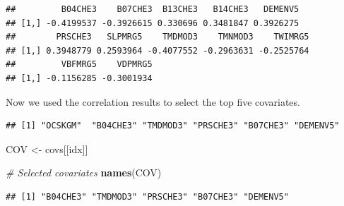 \documentclass[10pt,b5paper,]{book}
\newenvironment{Shaded}{\begin{snugshade}}{\end{snugshade}}
\newcommand{\CommentTok}[1]{\textcolor[rgb]{0.56,0.35,0.01}{\textit{#1}}}
\newcommand{\DecValTok}[1]{\textcolor[rgb]{0.00,0.00,0.81}{#1}}
\newcommand{\KeywordTok}[1]{\textcolor[rgb]{0.13,0.29,0.53}{\textbf{#1}}}
\newcommand{\NormalTok}[1]{#1}
\newcommand{\OperatorTok}[1]{\textcolor[rgb]{0.81,0.36,0.00}{\textbf{#1}}}
\newcommand{\OtherTok}[1]{\textcolor[rgb]{0.56,0.35,0.01}{#1}}
\newcommand{\StringTok}[1]{\textcolor[rgb]{0.31,0.60,0.02}{#1}}
\theoremstyle{definition}
\theoremstyle{definition}
\theoremstyle{definition}
\theoremstyle{remark}
\begin{document}
\begin{verbatim}
##         B04CHE3    B07CHE3  B13CHE3   B14CHE3   DEMENV5
## [1,] -0.4199537 -0.3926615 0.330696 0.3481847 0.3926275
##        PRSCHE3   SLPMRG5    TMDMOD3    TMNMOD3    TWIMRG5
## [1,] 0.3948779 0.2593964 -0.4077552 -0.2963631 -0.2525764
##         VBFMRG5    VDPMRG5
## [1,] -0.1156285 -0.3001934
\end{verbatim}

Now we used the correlation results to select the top five covariates.

\begin{Shaded}
\end{Shaded}

\begin{verbatim}
## [1] "OCSKGM"  "B04CHE3" "TMDMOD3" "PRSCHE3" "B07CHE3" "DEMENV5"
\end{verbatim}

\begin{Shaded}
\begin{Highlighting}[]
\NormalTok{COV <-}\StringTok{ }\NormalTok{covs[[idx]]}

\CommentTok{# Selected covariates}
\KeywordTok{names}\NormalTok{(COV)}
\end{Highlighting}
\end{Shaded}

\begin{verbatim}
## [1] "B04CHE3" "TMDMOD3" "PRSCHE3" "B07CHE3" "DEMENV5"
\end{verbatim}
\end{document}
